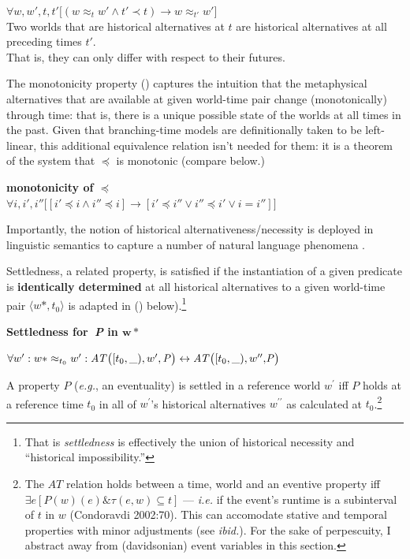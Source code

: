 \documentclass[12pt,dvipsnames]{report}
\begin{document}
	 $ \forall w,w',t,t'\big[(w\approx_t w'\wedge t'\prec t)\to w\approx_{t'} w'\big]$\\
	Two worlds that are historical alternatives at $t$ are historical alternatives at all preceding times $t'$.\\That is, they can only differ with respect to their futures.
	\xe

The monotonicity property () captures the intuition that the metaphysical alternatives that are available at given world-time pair change (monotonically) through time: that is, there is a unique possible state of the worlds at all times in the past.  Given that branching-time models are definitionally taken to be left-linear, this additional equivalence relation isn't needed for them: it is a theorem of the system that $ \preccurlyeq $ is monotonic (compare  below.)

\pex[exno=\getref{histaltdef}]
\a[label=b′] \textbf{monotonicity of $ \boldsymbol\preccurlyeq $}\\$ \forall i,i',i''\big[[i'\preccurlyeq i\wedge i''\preccurlyeq i]\to [i'\preccurlyeq i'' \vee i'' \preccurlyeq i' \vee i=i'']\big] $
\xe


Importantly, the notion of historical alternativeness/necessity is deployed in linguistic semantics to capture a number of natural language phenomena \citep[e.g.,][]{Thomason1984,Condoravdi2002,Kaufmann2002}.

Settledness, a related property, is satisfied if the instantiation of a given predicate is \textbf{identically determined} at all historical alternatives to a given world-time pair $\langle w*,t_0\rangle $ is adapted in () below).\footnote{That is \textit{settledness} is effectively the union of historical necessity and ``historical impossibility.''}

\pex \textbf{Settledness for\textbf{\textit{\ P}} in $ \boldsymbol{w*}$}


$\forall w^{\prime}:w*\approx_{t_0}w^{\prime}:\\\mathit{AT}\big([t_0,\_),w^\prime, \mathit P\big)\leftrightarrow \mathit{AT}\big([t_0,\_),w^{\prime\prime},\mathit{\!P}\big)$%


A property $P$ (\textit{e.g.}, an eventuality) is settled in a reference world $w^\prime$ iff $\mathit P$ holds at a reference time $t_0$ in all of $w^\prime$'s historical alternatives $w^{\prime\prime}$ as calculated at $t_0$.\footnote{The $AT$ relation holds between a time, world and an eventive property iff $\exists e[\mathit P(w)(e)\&\tau(e,w)\subseteq t]$ --- \textit{i.e.} if the event's runtime is a subinterval of $t$ in $w$ (Condoravdi 2002:70). This can accomodate stative and temporal properties with minor adjustments (see \textit{ibid.}). For the sake of perpescuity, I abstract away from (davidsonian) event variables in this section.}
\xe
\end{document}
